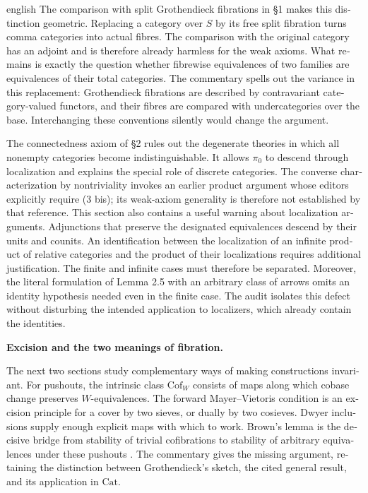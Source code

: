 \begin{otherlanguage}{english}
\begin{otherlanguage*}{english}
The comparison with split Grothendieck fibrations in \S1 makes this distinction geometric. Replacing a category over $S$ by its free split fibration turns comma categories into actual fibres. The comparison with the original category has an adjoint and is therefore already harmless for the weak axioms. What remains is exactly the question whether fibrewise equivalences of two families are equivalences of their total categories. The commentary spells out the variance in this replacement: Grothendieck fibrations are described by contravariant category-valued functors, and their fibres are compared with undercategories over the base. Interchanging these conventions silently would change the argument.

The connectedness axiom of \S2 rules out the degenerate theories in which all nonempty categories become indistinguishable. It allows $\pi_0$ to descend through localization and explains the special role of discrete categories. The converse characterization by nontriviality invokes an earlier product argument whose editors explicitly require (3 bis); its weak-axiom generality is therefore not established by that reference. This section also contains a useful warning about localization arguments. Adjunctions that preserve the designated equivalences descend by their units and counits. An identification between the localization of an infinite product of relative categories and the product of their localizations requires additional justification. The finite and infinite cases must therefore be separated. Moreover, the literal formulation of Lemma 2.5 with an arbitrary class of arrows omits an identity hypothesis needed even in the finite case. The audit isolates this defect without disturbing the intended application to localizers, which already contain the identities.

\medskip\noindent\textbf{Excision and the two meanings of fibration.}

The next two sections study complementary ways of making constructions invariant. For pushouts, the intrinsic class $\mathrm{Cof}_W$ consists of maps along which cobase change preserves $W$-equivalences. The forward Mayer--Vietoris condition is an excision principle for a cover by two sieves, or dually by two cosieves. Dwyer inclusions supply enough explicit maps with which to work. Brown's lemma is the decisive bridge from stability of trivial cofibrations to stability of arbitrary equivalences under these pushouts \citep{Brown1973}. The commentary gives the missing argument, retaining the distinction between Grothendieck's sketch, the cited general result, and its application in $\mathrm{Cat}$.


\end{otherlanguage*}
\end{otherlanguage}

